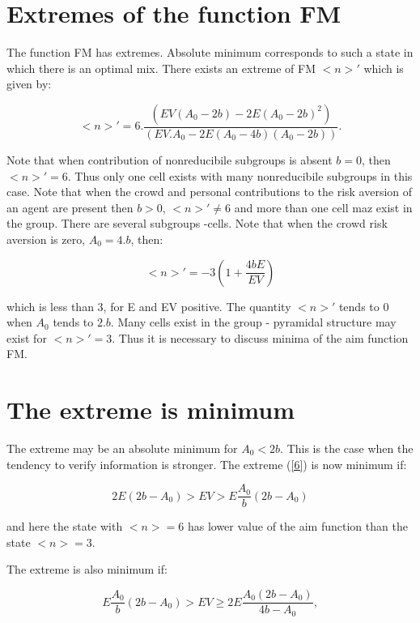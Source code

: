 \documentclass[10pt]{article}
\begin{document}
\section{Extremes of the function FM}

The function FM has extremes. Absolute minimum corresponds to such a state in which there is an optimal mix. There exists an extreme of FM $<n>'$ which is given by:

\begin{equation}
\label{6}
<n>'= 6.\frac{(EV (A_{0}-2b)- 2E(A_{0}-2b)^{2})}{( EV.A_{0}-2E(A_{0}-4b)(A_{0}-2b))}.
\end{equation}

Note that when contribution of nonreducibile subgroups is absent $b=0$, then $<n>'=6$. Thus only
one cell exists with many nonreducibile subgroups in this case.
Note that when the crowd and personal contributions to the risk aversion of an agent are present then $b>0$, $<n>' \neq 6$ and more than one cell maz exist in the group. There are several subgroups -cells. Note that
when the crowd risk aversion is zero, $A_{0} = 4.b $, then:

\begin{equation}
\label{6.1}
<n>'= -3(1 + \frac{4bE}{EV})
\end{equation}


which is less than 3, for E and EV positive. The quantity $ <n>' $ tends to 0 when $A_{0}$ tends to $2.b $. Many cells exist in the group - pyramidal structure may exist
for $ <n>' = 3 $. Thus it is necessary to discuss minima of the aim function
FM.


\section{The extreme is minimum}

The extreme may be an absolute minimum for $A_{0} < 2b$. This is the case when the tendency to verify information is stronger. The extreme (\ref{6}) is now minimum if:

\begin{equation}
\label{7}
2E(2b - A_{0})> EV > E \frac{A_{0}}{b} (2b - A_{0})
\end{equation}

and here the state with $<n> = 6$ has lower value of the aim function than the state $<n> = 3$.

The extreme is also minimum if:

\begin{equation}
\label{7.1}
E \frac{A_{0}}{b} (2b - A_{0}) > EV \geq 2E \frac{A_{0}(2b -A_{0})}{4b - A_{0}},
\end{equation}
\end{document}
